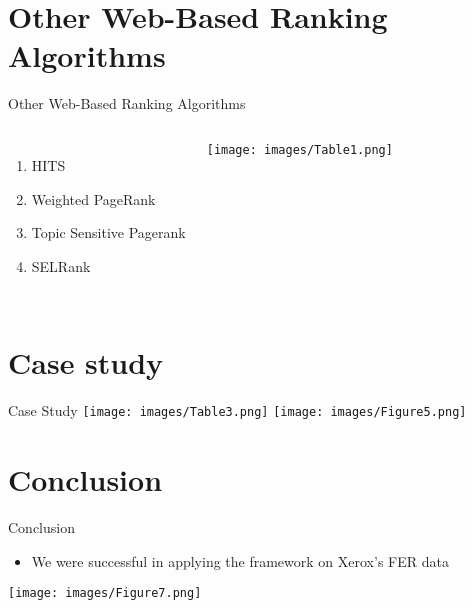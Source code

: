 \documentclass{beamer}
\begin{document}
\section{Other Web-Based Ranking Algorithms}
\begin{frame}{Other Web-Based Ranking Algorithms}

\begin{columns}
    \begin{enumerate}
        \item HITS
        \item Weighted PageRank
        \item Topic Sensitive Pagerank
        \item SELRank
    \end{enumerate}
    
    \texttt{[image: images/Table1.png]}
\end{columns}

\end{frame}


\section{Case study}
\begin{frame}{Case Study}
\texttt{[image: images/Table3.png]}
\texttt{[image: images/Figure5.png]}
\end{frame}

\section{Conclusion}
\begin{frame}{Conclusion}
\begin{center}
    \begin{itemize}
        \item We were successful in applying the framework on Xerox's FER data
    \end{itemize}
    \texttt{[image: images/Figure7.png]}
\end{center}
\end{frame}
\end{document}
